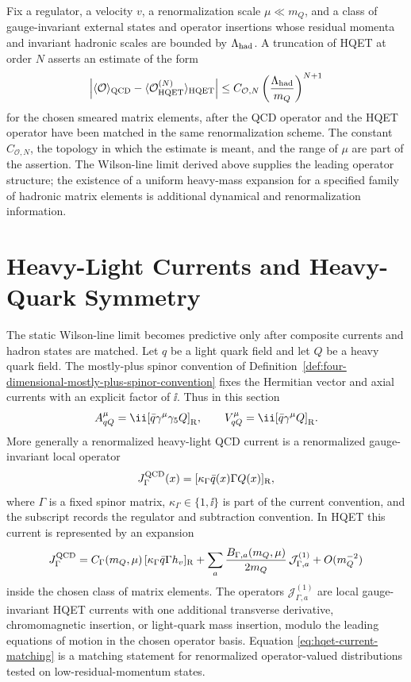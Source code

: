\begin{controlledapproximation}
\label{ca:hqet-heavy-mass-expansion}
Fix a regulator, a velocity \(v\), a renormalization scale \(\mu\ll m_Q\), and
a class of gauge-invariant external states and operator insertions whose
residual momenta and invariant hadronic scales are bounded by
\(\Lambda_{\rm had}\).  A truncation of HQET at order \(N\) asserts an
estimate of the form
\[
  \left|
  \langle \mathcal O\rangle_{\rm QCD}
  -
  \langle \mathcal O^{(N)}_{\rm HQET}\rangle_{\rm HQET}
  \right|
  \le
  C_{\mathcal O,N}
  \left(\frac{\Lambda_{\rm had}}{m_Q}\right)^{N+1}
\]
for the chosen smeared matrix elements, after the QCD operator and the HQET
operator have been matched in the same renormalization scheme.  The constant
\(C_{\mathcal O,N}\), the topology in which the estimate is meant, and the
  range of \(\mu\) are part of the assertion.  The Wilson-line limit derived
above supplies the leading operator structure; the existence of a uniform
heavy-mass expansion for a specified family of hadronic matrix elements is
additional dynamical and renormalization information.
\end{controlledapproximation}

\section{Heavy-Light Currents and Heavy-Quark Symmetry}
\label{sec:qcd-hqet-heavy-light-currents}

The static Wilson-line limit becomes predictive only after composite currents
and hadron states are matched.  Let \(q\) be a light quark field and let
\(Q\) be a heavy quark field.  The mostly-plus spinor convention of
Definition~\ref{def:four-dimensional-mostly-plus-spinor-convention} fixes the
Hermitian vector and axial currents with an explicit factor of \(\ii\).  Thus
in this section
\[
  A^\mu_{qQ}=\ii[\bar q\gamma^\mu\gamma_5Q]_{\rm R},
  \qquad
  V^\mu_{qQ}=\ii[\bar q\gamma^\mu Q]_{\rm R}.
\]
More generally a renormalized heavy-light QCD current is a renormalized
gauge-invariant local operator
\[
  J_\Gamma^{\rm QCD}(x)=[\kappa_\Gamma\bar q(x)\Gamma Q(x)]_{\rm R},
\]
where \(\Gamma\) is a fixed spinor matrix, \(\kappa_\Gamma\in\{1,\ii\}\) is
part of the current convention, and the subscript records the regulator and
subtraction convention.  In HQET this current is represented by an expansion
\begin{equation}
  J_\Gamma^{\rm QCD}
  =
  C_\Gamma(m_Q,\mu)\,[\kappa_\Gamma\bar q\Gamma h_v]_{\rm R}
  +
  \sum_a\frac{B_{\Gamma,a}(m_Q,\mu)}{2m_Q}\,
  \mathcal J_{\Gamma,a}^{(1)}
  +O(m_Q^{-2})
  \label{eq:hqet-current-matching}
\end{equation}
inside the chosen class of matrix elements.  The operators
\(\mathcal J_{\Gamma,a}^{(1)}\) are local gauge-invariant HQET currents with
one additional transverse derivative, chromomagnetic insertion, or light-quark
mass insertion, modulo the leading equations of motion in the chosen operator
basis.  Equation \eqref{eq:hqet-current-matching} is a matching statement for
renormalized operator-valued distributions tested on low-residual-momentum
states.

